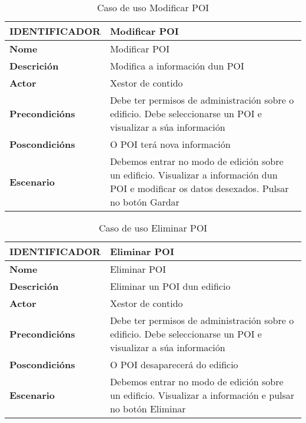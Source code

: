 \begin{table}[tbp]
	\begin{tabular}{|l|p{10cm}|}
		\hline 
		\textbf{IDENTIFICADOR}	& \textbf{Modificar POI} \\ 
		\hline 
		\textbf{Nome} & Modificar POI \\ 
		\hline 
		\textbf{Descrición} & Modifica a información dun POI \\ 
		\hline 
		\textbf{Actor} & Xestor de contido \\ 
		\hline 
		\textbf{Precondicións} &  Debe ter permisos de administración sobre o edificio. Debe seleccionarse un POI e visualizar a súa información \\ 
		\hline 
		\textbf{Poscondicións} & O POI terá nova información \\ 
		\hline 
		\textbf{Escenario} & Debemos entrar no modo de edición sobre un edificio. Visualizar a información dun POI e modificar os datos desexados. Pulsar no botón Gardar \\ 
		\hline 
	\end{tabular}
	\caption{Caso de uso Modificar POI}
	\label{tab:cuModificarPOI}
\end{table}

\begin{table}[tbp]
	\begin{tabular}{|l|p{10cm}|}
		\hline 
		\textbf{IDENTIFICADOR}	& \textbf{Eliminar POI} \\ 
		\hline 
		\textbf{Nome} & Eliminar POI \\ 
		\hline 
		\textbf{Descrición} & Eliminar un POI dun edificio \\ 
		\hline 
		\textbf{Actor} & Xestor de contido \\ 
		\hline 
		\textbf{Precondicións} & Debe ter permisos de administración sobre o edificio. Debe seleccionarse un POI e visualizar a súa información \\ 
		\hline 
		\textbf{Poscondicións} & O POI desaparecerá do edificio \\ 
		\hline 
		\textbf{Escenario} & Debemos entrar no modo de edición sobre un edificio. Visualizar a información e pulsar no botón Eliminar \\ 
		\hline 
	\end{tabular}
	\caption{Caso de uso Eliminar POI}
	\label{tab:cuEliminarPOI}
\end{table}


